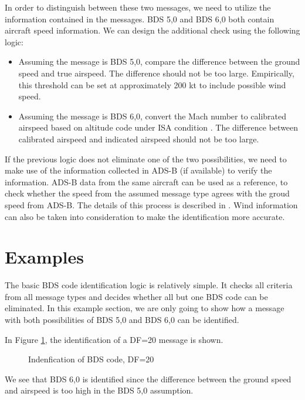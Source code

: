 In order to distinguish between these two messages, we need to utilize the information contained in the messages. BDS 5,0 and BDS 6,0 both contain aircraft speed information. We can design the additional check using the following logic:

\begin{itemize}
    \item Assuming the message is BDS 5,0, compare the difference between the ground speed and true airspeed. The difference should not be too large. Empirically, this threshold can be set at approximately 200 kt to include possible wind speed. 
    \item Assuming the message is BDS 6,0, convert the Mach number to calibrated airspeed based on altitude code under ISA condition \cite{young2017}. The difference between calibrated airspeed and indicated airspeed should not be too large.
\end{itemize}

If the previous logic does not eliminate one of the two possibilities, we need to make use of the information collected in ADS-B (if available) to verify the information. ADS-B data from the same aircraft can be used as a reference, to check whether the speed from the assumed message type agrees with the groud speed from ADS-B. The details of this process is described in \cite{sun2019pymodes}. Wind information can also be taken into consideration to make the identification more accurate.


\section{Examples}

The basic BDS code identification logic is relatively simple. It checks all criteria from all message types and decides whether all but one BDS code can be eliminated. In this example section, we are only going to show how a message with both possibilities of BDS 5,0 and BDS 6,0 can be identified.


In Figure \ref{fig:bds_bds_infer_example_1}, the identification of a DF=20 message is shown. 

\begin{figure}[ht]
\centering

\caption{Indenfication of BDS code, DF=20}
\label{fig:bds_bds_infer_example_1}
\end{figure}

We see that BDS 6,0 is identified since the difference between the ground speed and airspeed is too high in the BDS 5,0 assumption.

